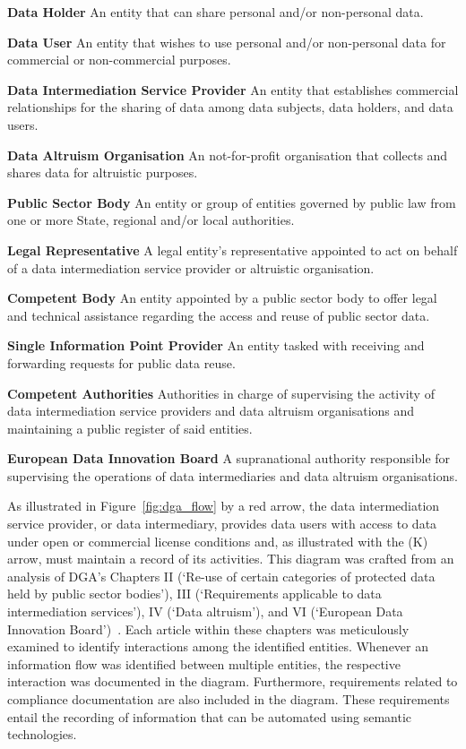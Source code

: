 \textbf{Data Holder} An entity that can share personal and/or non-personal data.

\textbf{Data User} An entity that wishes to use personal and/or non-personal data for commercial or non-commercial purposes.

\textbf{Data Intermediation Service Provider} An entity that establishes commercial relationships for the sharing of data among data subjects, data holders, and data users.

\textbf{Data Altruism Organisation} An not-for-profit organisation that collects and shares data for altruistic purposes.

\textbf{Public Sector Body} An entity or group of entities governed by public law from one or more State, regional and/or local authorities.

\textbf{Legal Representative} A legal entity's representative appointed to act on behalf of a data intermediation service provider or altruistic organisation.

\textbf{Competent Body} An entity appointed by a public sector body to offer legal and technical assistance regarding the access and reuse of public sector data.

\textbf{Single Information Point Provider} An entity tasked with receiving and forwarding requests for public data reuse.

\textbf{Competent Authorities} Authorities in charge of supervising the activity of data intermediation service providers and data altruism organisations and maintaining a public register of said entities.

\textbf{European Data Innovation Board} A supranational authority responsible for supervising the operations of data intermediaries and data altruism organisations.

As illustrated in Figure~\ref{fig:dga_flow} by a red arrow, the data intermediation service provider, or data intermediary, provides data users with access to data under open or commercial license conditions and, as illustrated with the (K) arrow, must maintain a record of its activities.
This diagram was crafted from an analysis of DGA's Chapters II (`Re-use of certain categories of protected data held by public sector bodies'), III (`Requirements applicable to data intermediation services'), IV (`Data altruism'), and VI (`European Data Innovation Board')~\citeyearpar{noauthor_regulation_2022}.
Each article within these chapters was meticulously examined to identify interactions among the identified entities.
Whenever an information flow was identified between multiple entities, the respective interaction was documented in the diagram.
Furthermore, requirements related to compliance documentation are also included in the diagram.
These requirements entail the recording of information that can be automated using semantic technologies.

